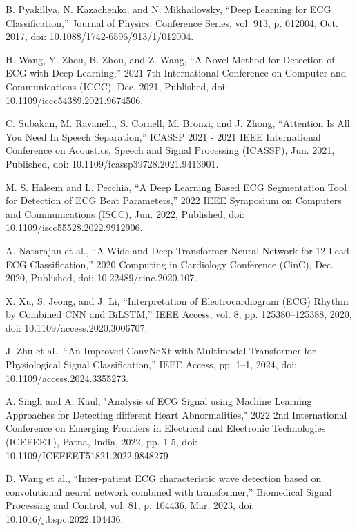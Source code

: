 \documentclass[conference]{IEEEtran}
\begin{document}
\begin{thebibliography}{00}
 B. Pyakillya, N. Kazachenko, and N. Mikhailovsky, “Deep Learning for ECG Classification,” Journal of Physics: Conference Series, vol. 913, p. 012004, Oct. 2017, doi: 10.1088/1742-6596/913/1/012004.

 H. Wang, Y. Zhou, B. Zhou, and Z. Wang, “A Novel Method for Detection of ECG with Deep Learning,” 2021 7th International Conference on Computer and Communications (ICCC), Dec. 2021, Published, doi: 10.1109/iccc54389.2021.9674506.


  C. Subakan, M. Ravanelli, S. Cornell, M. Bronzi, and J. Zhong, “Attention Is All You Need In Speech Separation,” ICASSP 2021 - 2021 IEEE International Conference on Acoustics, Speech and Signal Processing (ICASSP), Jun. 2021, Published, doi: 10.1109/icassp39728.2021.9413901.

 M. S. Haleem and L. Pecchia, “A Deep Learning Based ECG Segmentation Tool for Detection of ECG Beat Parameters,” 2022 IEEE Symposium on Computers and Communications (ISCC), Jun. 2022, Published, doi: 10.1109/iscc55528.2022.9912906.

 A. Natarajan et al., “A Wide and Deep Transformer Neural Network for 12-Lead ECG Classification,” 2020 Computing in Cardiology Conference (CinC), Dec. 2020, Published, doi: 10.22489/cinc.2020.107.

 X. Xu, S. Jeong, and J. Li, “Interpretation of Electrocardiogram (ECG) Rhythm by Combined CNN and BiLSTM,” IEEE Access, vol. 8, pp. 125380–125388, 2020, doi: 10.1109/access.2020.3006707.

 J. Zhu et al., “An Improved ConvNeXt with Multimodal Transformer for Physiological Signal Classification,” IEEE Access, pp. 1–1, 2024, doi: 10.1109/access.2024.3355273. 

 A. Singh and A. Kaul, "Analysis of ECG Signal using Machine Learning Approaches for Detecting different Heart Abnormalities," 2022 2nd International Conference on Emerging Frontiers in Electrical and Electronic Technologies (ICEFEET), Patna, India, 2022, pp. 1-5, doi: 10.1109/ICEFEET51821.2022.9848279

 D. Wang et al., “Inter-patient ECG characteristic wave detection based on convolutional neural network combined with transformer,” Biomedical Signal Processing and Control, vol. 81, p. 104436, Mar. 2023, doi: 10.1016/j.bspc.2022.104436.


\end{thebibliography}
\end{document}
